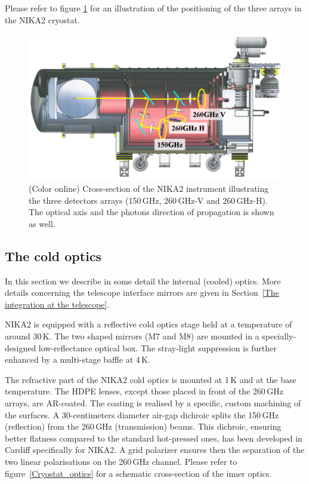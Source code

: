 \documentclass[]{aa} %
\begin{document}
Please refer to figure \ref{Cryostat} for an illustration of the positioning of the three arrays in the NIKA2 cryostat.
 
\begin{figure}[h]
   \centering
   \includegraphics[width=.95\linewidth]{Fig1_cryo.png}
      \caption{(Color online) Cross-section of the NIKA2 instrument illustrating the three detectors arrays (150\,GHz, 260\,GHz-V and 260\,GHz-H). The optical axis and the photons direction of propagation is shown as well.}
         \label{Cryostat}
\end{figure}


 \subsection{The cold optics}

In this section we describe in some detail the internal (cooled) optics. More details concerning the telescope interface mirrors are given in Section~\ref{The integration at the telescope}.

NIKA2 is equipped with a reflective cold optics stage held at a temperature of around 30\,K. The two shaped mirrors (M7 and M8) are mounted in a specially-designed low-reflectance optical box. The stray-light suppression is further enhanced by a multi-stage baffle at 4\,K.

The refractive part of the NIKA2 cold optics is mounted at 1\,K and at the base temperature. The HDPE lenses, except those placed in front of the 260\,GHz arrays, are AR-coated. The coating is realised by a specific, custom machining of the surfaces. A 30-centimeters diameter air-gap dichroic splits the 150\,GHz (reflection) from the 260\,GHz (transmission) beams. This dichroic, ensuring better flatness compared to the standard hot-pressed ones, has been developed in Cardiff specifically for NIKA2. A grid polarizer ensures then the separation of the two linear polarisations on the 260\,GHz channel. Please refer to figure~\ref{Cryostat_optics} for a schematic cross-section of the inner optics.
\end{document}
